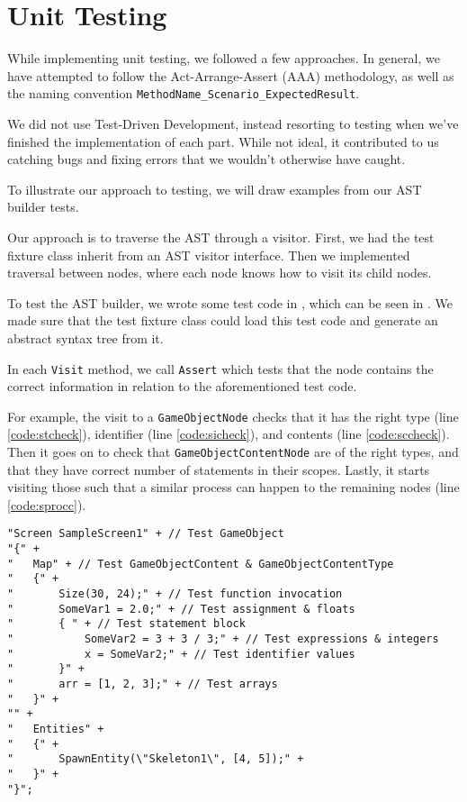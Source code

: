 \section{Unit Testing}
While implementing unit testing, we followed a few approaches.
In general, we have attempted to follow the Act-Arrange-Assert (AAA)
methodology, as well as the naming convention 
\texttt{MethodName\_Scenario\_ExpectedResult}.

We did not use Test-Driven Development, instead resorting to testing
when we've finished the implementation of each part. While not ideal, it
contributed to us catching bugs and fixing errors that we wouldn't
otherwise have caught.

To illustrate our approach to testing, we will draw examples from our
AST builder tests.

Our approach is to traverse the AST through a visitor. First,
we had the test fixture class inherit from an AST visitor interface.
Then we implemented traversal between nodes, where each node knows how
to visit its child nodes.

To test the AST builder, we wrote some test code in \dazel{}, which can be seen in . We made sure that
the test fixture class could load this test code and generate an abstract syntax tree from it.

In each \texttt{Visit} method, we call \texttt{Assert} which tests
that the node contains the correct information in relation to the
aforementioned \dazel{} test code.

For example, the visit to a \texttt{GameObjectNode} checks that it has the
right type (line \ref{code:stcheck}), identifier (line \ref{code:sicheck}), and contents (line \ref{code:sccheck}). Then it goes on to check that
\texttt{GameObjectContentNode} are of the right types, and that they have
correct number of statements in their scopes. Lastly, it starts visiting
those such that a similar process can happen to the remaining nodes (line \ref{code:sprocc}).

\begin{lstlisting}[language=CSharp, caption={AST Builder \dazel{} test code}, label={lst:asttestcode}]
"Screen SampleScreen1" + // Test GameObject
"{" +
"   Map" + // Test GameObjectContent & GameObjectContentType
"   {" +
"       Size(30, 24);" + // Test function invocation
"       SomeVar1 = 2.0;" + // Test assignment & floats
"       { " + // Test statement block
"           SomeVar2 = 3 + 3 / 3;" + // Test expressions & integers
"           x = SomeVar2;" + // Test identifier values
"       }" +
"       arr = [1, 2, 3];" + // Test arrays
"   }" +
"" +
"   Entities" +
"   {" +
"       SpawnEntity(\"Skeleton1\", [4, 5]);" +
"   }" +
"}";
\end{lstlisting}


